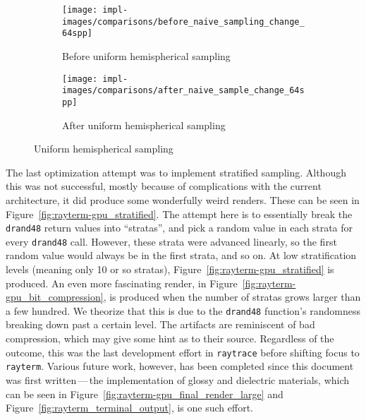 \vspace{0.3em}
\begin{figure}[htb]
  \centering
  \begin{subfigure}[htb]{0.45\textwidth}
    \texttt{[image: impl-images/comparisons/before\_naive\_sampling\_change\_64spp]}
    \caption{Before uniform hemispherical sampling}
\label{fig:rayterm-gpu_hemispherical_sampling_before}
  \end{subfigure}
  \begin{subfigure}[htb]{0.45\textwidth}
    \texttt{[image: impl-images/comparisons/after\_naive\_sample\_change\_64spp]}
    \caption{After uniform hemispherical sampling}
\label{fig:rayterm-gpu_hemispherical_sampling_after}
  \end{subfigure}
  \caption{Uniform hemispherical sampling}
\label{fig:rayterm-gpu_hemispherical_sampling}
\end{figure}

The last optimization attempt was to implement stratified sampling.
Although this was not successful, mostly because of complications with the current architecture, it did produce some wonderfully weird renders.
These can be seen in Figure~\ref{fig:rayterm-gpu_stratified}.
The attempt here is to essentially break the \texttt{drand48} return values into ``stratas'', and pick a random value in each strata for every \texttt{drand48} call.
However, these strata were advanced linearly, so the first random value would always be in the first strata, and so on.
At low stratification levels (meaning only 10 or so stratas), Figure~\ref{fig:rayterm-gpu_stratified} is produced.
An even more fascinating render, in Figure~\ref{fig:rayterm-gpu_bit_compression}, is produced when the number of stratas grows larger than a few hundred.
We theorize that this is due to the \texttt{drand48} function's randomness breaking down past a certain level.
The artifacts are reminiscent of bad compression, which may give some hint as to their source.
Regardless of the outcome, this was the last development effort in \texttt{raytrace} before shifting focus to \texttt{rayterm}.
Various future work, however, has been completed since this document was first written\,---\,the implementation of glossy and dielectric materials, which can be seen in Figure~\ref{fig:rayterm-gpu_final_render_large} and Figure~\ref{fig:rayterm_terminal_output}, is one such effort.

